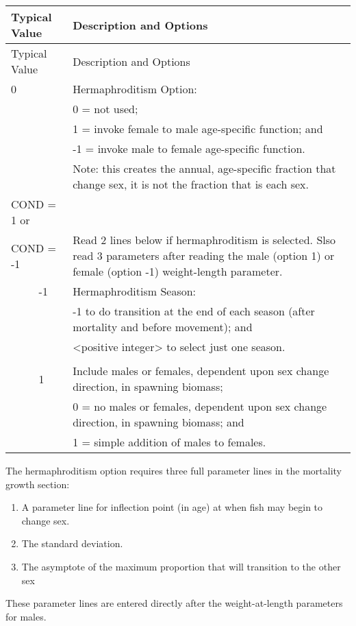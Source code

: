 \begin{longtable}{p{0.5cm} p{2cm} p{13cm}}
	\hline	
	\multicolumn{2}{l}{Typical Value} & Description and Options\Tstrut\Bstrut\\
	\hline
	\endfirsthead

	\hline
	\multicolumn{2}{l}{Typical Value} & Description and Options\Tstrut\Bstrut\\
	\hline
	\endhead
	\hline

	\endfoot
	
	\endlastfoot

	0 & & Hermaphroditism Option:\Tstrut\\
	 &  & 0 = not used; \\
	 &  & 1 = invoke female to male age-specific function; and \\
	 &  & -1 = invoke male to female age-specific function. \\
	 &  & Note:  this creates the annual, age-specific fraction that change sex, it is not the fraction that is each sex.\Bstrut\\
	\hline

	\multicolumn{2}{l}{COND = 1 or} \Tstrut & \\
	\multicolumn{2}{l}{COND = -1}  & Read 2 lines below if hermaphroditism is selected. Slso read 3 parameters after reading the male (option 1) or female (option -1) weight-length parameter.\Bstrut\\
	& -1 & Hermaphroditism Season: \\
	&    & -1 to do transition at the end of each season (after mortality and before movement); and\\
	&    & <positive integer> to select just one season.\\
	\\
	& 1  & Include males or females, dependent upon sex change direction, in spawning biomass;  \\
	&    & 0 = no males or females, dependent upon sex change direction, in spawning biomass; and \\
	&    & 1 = simple addition of males to females. \Bstrut\\
	\hline
\end{longtable}

The hermaphroditism option requires three full parameter lines in the mortality growth section: 
\begin{enumerate}
	\item A parameter line for inflection point (in age) at when fish may begin to change sex.
	\item The standard deviation.
	\item The asymptote of the maximum proportion that will transition to the other sex
\end{enumerate}
These parameter lines are entered directly after the weight-at-length parameters for males.

